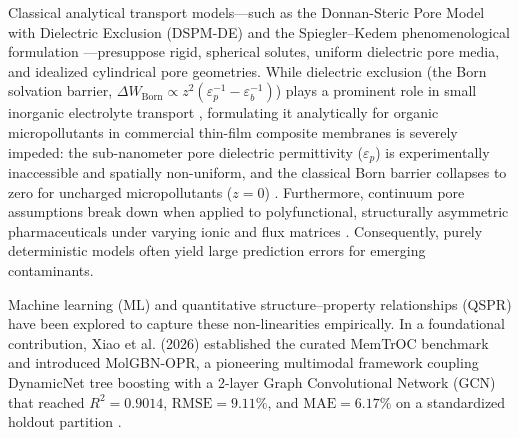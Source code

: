 \documentclass[11pt]{article}
\newcommand{\rsq}{R^{2}}
\begin{document}
Classical analytical transport models---such as the Donnan-Steric Pore Model with Dielectric Exclusion (DSPM-DE) \cite{bowen2002,bandini2003} and the Spiegler--Kedem phenomenological formulation \cite{spiegler1966,kedem1958}---presuppose rigid, spherical solutes, uniform dielectric pore media, and idealized cylindrical pore geometries. While dielectric exclusion (the Born solvation barrier, $\Delta W_{\mathrm{Born}} \propto z^2(\varepsilon_p^{-1} - \varepsilon_b^{-1})$) plays a prominent role in small inorganic electrolyte transport \cite{bandini2003}, formulating it analytically for organic micropollutants in commercial thin-film composite membranes is severely impeded: the sub-nanometer pore dielectric permittivity ($\varepsilon_p$) is experimentally inaccessible and spatially non-uniform, and the classical Born barrier collapses to zero for uncharged micropollutants ($z=0$) \cite{lin2022}. Furthermore, continuum pore assumptions break down when applied to polyfunctional, structurally asymmetric pharmaceuticals under varying ionic and flux matrices \cite{lin2022}. Consequently, purely deterministic models often yield large prediction errors for emerging contaminants.

Machine learning (ML) and quantitative structure--property relationships (QSPR) have been explored to capture these non-linearities empirically. In a foundational contribution, Xiao et al. (2026) established the curated MemTrOC benchmark and introduced MolGBN-OPR, a pioneering multimodal framework coupling DynamicNet tree boosting with a 2-layer Graph Convolutional Network (GCN) that reached $\rsq = 0.9014$, $\mathrm{RMSE} = 9.11\%$, and $\mathrm{MAE} = 6.17\%$ on a standardized holdout partition \cite{xiao2026}.
\end{document}
